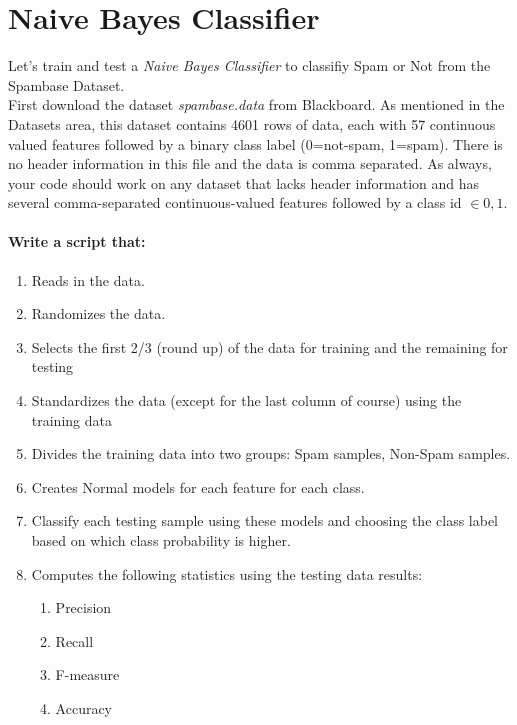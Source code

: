 \documentclass[12pt]{article}
\begin{document}
\newpage
\section{Naive Bayes Classifier}\label{naive}
Let's train and test a \emph{Naive Bayes Classifier} to classifiy Spam or Not from the Spambase Dataset.\\

\noindent
First download the dataset \emph{spambase.data} from Blackboard.  As mentioned in the Datasets area, this dataset contains 4601 rows of data, each with 57 continuous valued features followed by a binary class label (0=not-spam, 1=spam).  There is no header information in this file and the data is comma separated.  As always, your code should work on any dataset that lacks header information and has several comma-separated continuous-valued features followed by a class id $\in {0,1}$.\\

\noindent
\paragraph{Write a script that:}
\begin{enumerate}
\item Reads in the data.
\item Randomizes the data.
\item Selects the first 2/3 (round up) of the data for training and the remaining for testing
\item Standardizes the data (except for the last column of course) using the training data
\item Divides the training data into two groups: Spam samples, Non-Spam samples.
\item Creates Normal models for each feature for each class.
\item Classify each testing sample using these models and choosing the class label based on which class probability is higher.
\item Computes the following statistics using the testing data results:
\begin{enumerate}
\item Precision
\item Recall
\item F-measure
\item Accuracy
\end{enumerate}
\end{enumerate}
\end{document}

